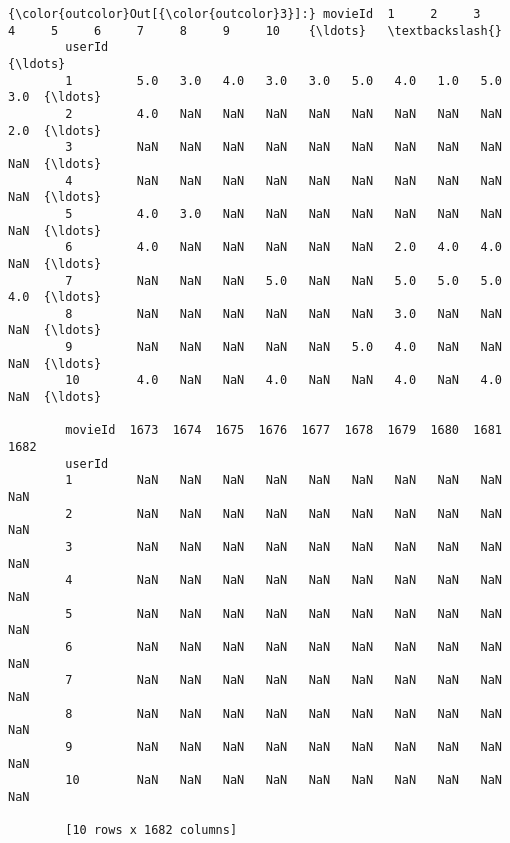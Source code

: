 \documentclass[11pt]{article}
\begin{document}
\begin{Verbatim}[commandchars=\\\{\}]
{\color{outcolor}Out[{\color{outcolor}3}]:} movieId  1     2     3     4     5     6     7     8     9     10    {\ldots}   \textbackslash{}
        userId                                                               {\ldots}    
        1         5.0   3.0   4.0   3.0   3.0   5.0   4.0   1.0   5.0   3.0  {\ldots}    
        2         4.0   NaN   NaN   NaN   NaN   NaN   NaN   NaN   NaN   2.0  {\ldots}    
        3         NaN   NaN   NaN   NaN   NaN   NaN   NaN   NaN   NaN   NaN  {\ldots}    
        4         NaN   NaN   NaN   NaN   NaN   NaN   NaN   NaN   NaN   NaN  {\ldots}    
        5         4.0   3.0   NaN   NaN   NaN   NaN   NaN   NaN   NaN   NaN  {\ldots}    
        6         4.0   NaN   NaN   NaN   NaN   NaN   2.0   4.0   4.0   NaN  {\ldots}    
        7         NaN   NaN   NaN   5.0   NaN   NaN   5.0   5.0   5.0   4.0  {\ldots}    
        8         NaN   NaN   NaN   NaN   NaN   NaN   3.0   NaN   NaN   NaN  {\ldots}    
        9         NaN   NaN   NaN   NaN   NaN   5.0   4.0   NaN   NaN   NaN  {\ldots}    
        10        4.0   NaN   NaN   4.0   NaN   NaN   4.0   NaN   4.0   NaN  {\ldots}    
        
        movieId  1673  1674  1675  1676  1677  1678  1679  1680  1681  1682  
        userId                                                               
        1         NaN   NaN   NaN   NaN   NaN   NaN   NaN   NaN   NaN   NaN  
        2         NaN   NaN   NaN   NaN   NaN   NaN   NaN   NaN   NaN   NaN  
        3         NaN   NaN   NaN   NaN   NaN   NaN   NaN   NaN   NaN   NaN  
        4         NaN   NaN   NaN   NaN   NaN   NaN   NaN   NaN   NaN   NaN  
        5         NaN   NaN   NaN   NaN   NaN   NaN   NaN   NaN   NaN   NaN  
        6         NaN   NaN   NaN   NaN   NaN   NaN   NaN   NaN   NaN   NaN  
        7         NaN   NaN   NaN   NaN   NaN   NaN   NaN   NaN   NaN   NaN  
        8         NaN   NaN   NaN   NaN   NaN   NaN   NaN   NaN   NaN   NaN  
        9         NaN   NaN   NaN   NaN   NaN   NaN   NaN   NaN   NaN   NaN  
        10        NaN   NaN   NaN   NaN   NaN   NaN   NaN   NaN   NaN   NaN  
        
        [10 rows x 1682 columns]
\end{Verbatim}
            
\end{document}
